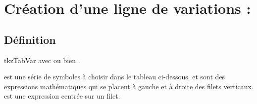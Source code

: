 \section{Création d'une ligne de variations : }
\subsection{Définition}

\begin{NewMacroBox}{tkzTabVar}{}
  avec  ou bien     .
  
\noindent{} est une série de symboles à choisir dans le tableau ci-dessous.  et  sont des expressions mathématiques qui se placent à gauche et à droite des filets verticaux.  est une expression centrée sur un filet.


\end{NewMacroBox}
